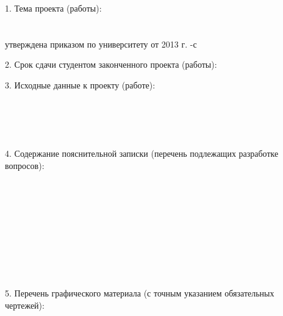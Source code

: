 {  1. Тема проекта (работы):
  \lineunderscore\\
  \lineunderscore\\
  \lineunderscore\\
  утверждена приказом по университету от \uline{\hspace*{1.5em}} \uline{\hspace*{5em}} 2013 г.  \No{} \uline{\hspace*{2em}}-с

  \vspace{1em}

  2. Срок сдачи студентом законченного проекта (работы): \lineunderscore

  \vspace{1em}

  3. Исходные данные к проекту (работе):
  \lineunderscore\\
  \lineunderscore\\
  \lineunderscore\\
  \lineunderscore\\
  \lineunderscore\\
  \lineunderscore

  \vspace{1em}

  4. Содержание пояснительной записки (перечень подлежащих разработке вопросов):
  \lineunderscore\\
  \lineunderscore\\
  \lineunderscore\\
  \lineunderscore\\
  \lineunderscore\\
  \lineunderscore\\
  \lineunderscore\\
  \lineunderscore\\
  \lineunderscore\\
  \lineunderscore\\
  \lineunderscore

  \clearpage
  \thispagestyle{empty}

  5. Перечень графического материала (с точным указанием обязательных чертежей):
  \lineunderscore\\
  \lineunderscore\\
  \lineunderscore\\
  \lineunderscore\\
  \lineunderscore\\
  \lineunderscore\\
  \lineunderscore\\
  \lineunderscore

}
